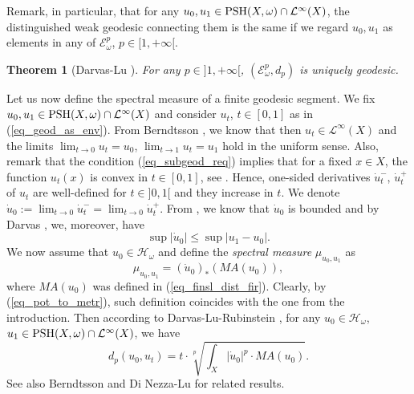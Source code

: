 \documentclass[12pt]{article}
\numberwithin{equation}{section}
\theoremstyle{theorem}
\newtheorem{thm}{Theorem}[section]
\theoremstyle{definition}
\theoremstyle{remark}
\begin{document}
	Remark, in particular, that for any $u_0, u_1 \in {\rm{PSH}}(X, \omega) \cap \mathcal{L}^{\infty}(X)$, the distinguished weak geodesic connecting them is the same if we regard $u_0, u_1$ as elements in any of $\mathcal{E}_{\omega}^p$, $p \in [1, + \infty[$.
	\par 
	\begin{thm}[{Darvas-Lu \cite[Theorem 2]{DarLuGeod} }]\label{thm_dar_lu_uniq_geod}
		For any $p \in ]1, + \infty[$, $(\mathcal{E}_{\omega}^p, d_p)$ is uniquely geodesic.
	\end{thm}
	\par 
	\begin{sloppypar}
	Let us now define the spectral measure of a finite geodesic segment.
	We fix $u_0, u_1 \in {\rm{PSH}}(X, \omega) \cap \mathcal{L}^{\infty}(X)$ and consider $u_t$, $t \in [0, 1]$ as in (\ref{eq_geod_as_env}).
	From Berndtsson \cite[\S 2.2]{BernBrunnMink}, we know that then $u_t \in \mathcal{L}^{\infty}(X)$ and the limits $\lim_{t \to 0} u_t = u_0$, $\lim_{t \to 1} u_t = u_1$ hold in the uniform sense.
	Also, remark that the condition (\ref{eq_subgeod_req}) implies that for a fixed $x \in X$, the function $u_t(x)$ is convex in $t \in [0, 1]$, see \cite[Theorem I.5.13]{DemCompl}.
	Hence, one-sided derivatives $\dot{u}_t^{-}$, $\dot{u}_t^{+}$ of $u_t$ are well-defined for $t \in ]0, 1[$ and they increase in $t$.
	We denote $\dot{u}_0 := \lim_{t \to 0} \dot{u}_t^{-} = \lim_{t \to 0} \dot{u}_t^{+}$.
	From \cite[\S 2.2]{BernBrunnMink}, we know that $\dot{u}_0$ is bounded and by Darvas \cite[Theorem 1]{DarvWeakGeod}, we, moreover, have
	\begin{equation}
		\sup |\dot{u}_0| \leq \sup |u_1 - u_0|.
	\end{equation}
	We now assume that $u_0 \in \mathcal{H}_{\omega}$ and define the \textit{spectral measure} $\mu_{u_0, u_1}$ as 
	\begin{equation}\label{eq_spec_meas_defn_seg}
		\mu_{u_0, u_1} = (\dot{u}_0)_* (MA(u_0)),
	\end{equation}
	where $MA(u_0)$ was defined in (\ref{eq_finsl_dist_fir}).
	Clearly, by (\ref{eq_pot_to_metr}), such definition coincides with the one from the introduction.
	Then according to Darvas-Lu-Rubinstein \cite[Lemma 4.5]{DarvLuRub}, for any $u_0 \in \mathcal{H}_{\omega}$, $u_1 \in {\rm{PSH}}(X, \omega) \cap \mathcal{L}^{\infty}(X)$, we have
	\begin{equation}\label{eq_d_p_berndss}
		d_p(u_0, u_t)
		=
		t \cdot \sqrt[p]{ \int_X |\dot{u}_0|^p \cdot MA(u_0) }.
	\end{equation}
	See also Berndtsson \cite{BerndtProb} and Di Nezza-Lu \cite{DiNezzLuGeodDist} for related results.
	\end{sloppypar}
\end{document}
